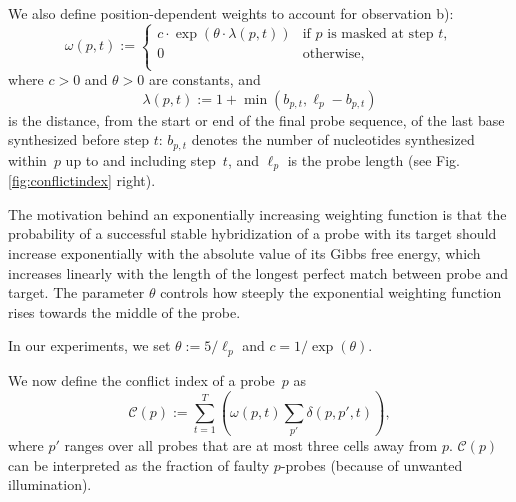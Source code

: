 \documentclass{llncs}
\newcommand{\ignore}[1]{}
\begin{document}
We also define position-dependent weights to account for observation b):
\begin{equation}\label{eq:pos_mult}
\omega(p,t) :=
\left\{
  \begin{array}{ll}
    c \cdot \exp{\left(\theta \cdot \lambda(p,t)\right)} & \mbox{if $p$ is masked at step $t$}, \\
    0 & \mbox{otherwise}, \\
  \end{array}
\right.
\end{equation}
where $c>0$ and $\theta>0$ are constants, and
\begin{equation}\label{eq:base_pos}
  \lambda(p,t) := 1 + \min(b_{p,t},\ell_{p} - b_{p,t})
\end{equation}
is the distance, from the start or end of the final probe sequence, of the
last base synthesized before step $t$: $b_{p,t}$ denotes the number of
nucleotides synthesized within~$p$ up to and including step~$t$, and
$\ell_p$ is the probe length (see Fig.\,\ref{fig:conflictindex}
right).

The motivation behind an exponentially increasing weighting function is that
the probability of a successful stable hybridization of a probe with its
target should increase exponentially with the absolute value of its Gibbs free
energy, which increases linearly with the length of the longest perfect match
between probe and target. The parameter $\theta$ controls how steeply the
exponential weighting function rises towards the middle of the probe.
%
\ignore{It is generally agreed that the chances of a successful hybridization
  between probe and target are higher if a mismatched base occurs at the
  extremities of the formed duplex instead of at its center. The precise
  effects of this position, however, is not yet fully understood and has been
  an active topic of research \cite{BINDER05}.}
%
In our experiments, we set $\theta := 5/\ell_p$ and $c = 1/\exp{(\theta)}$.


We now define the conflict index of a probe~$p$ as
\begin{equation}
\label{eq:conf_idx}
\mathcal{C}(p) := \sum_{t=1}^{T} \left( \omega(p,t) \sum_{p'} \delta(p,p',t) \right),
\end{equation}
where $p'$ ranges over all probes that are at most three cells away
from $p$. $\mathcal{C}(p)$ can be interpreted as the fraction of
faulty $p$-probes (because of unwanted illumination).
\end{document}
